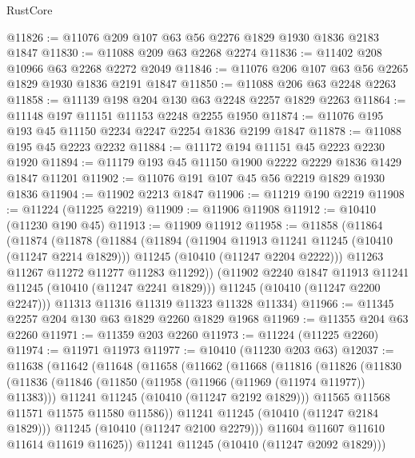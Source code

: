 \begin{lexlean}{RustCore}
\begin{coremodule}
@11826 := @11076 @209 @107 @63 @56 @2276 @1829 @1930 @1836 @2183 @1847
@11830 := @11088 @209 @63 @2268 @2274
@11836 := @11402 @208 @10966 @63 @2268 @2272 @2049
@11846 := @11076 @206 @107 @63 @56 @2265 @1829 @1930 @1836 @2191 @1847
@11850 := @11088 @206 @63 @2248 @2263
@11858 := @11139 @198 @204 @130 @63 @2248 @2257 @1829 @2263
@11864 := @11148 @197 @11151 @11153 @2248 @2255 @1950
@11874 := @11076 @195 @193 @45 @11150 @2234 @2247 @2254 @1836 @2199 @1847
@11878 := @11088 @195 @45 @2223 @2232
@11884 := @11172 @194 @11151 @45 @2223 @2230 @1920
@11894 := @11179 @193 @45 @11150 @1900 @2222 @2229 @1836 @1429 @1847 @11201
@11902 := @11076 @191 @107 @45 @56 @2219 @1829 @1930 @1836
@11904 := @11902 @2213 @1847
@11906 := @11219 @190 @2219
@11908 := @11224 (@11225 @2219)
@11909 := @11906 @11908
@11912 := @10410 (@11230 @190 @45)
@11913 := @11909 @11912
@11958 := @11858
    (@11864
      (@11874
        (@11878
          (@11884
            (@11894
              (@11904 @11913 @11241 @11245 (@10410 (@11247 @2214 @1829)))
              @11245
              (@10410 (@11247 @2204 @2222)))
            @11263
            @11267
            @11272
            @11277
            @11283
            @11292))
        (@11902 @2240 @1847 @11913 @11241 @11245 (@10410 (@11247 @2241 @1829)))
        @11245
        (@10410 (@11247 @2200 @2247)))
      @11313
      @11316
      @11319
      @11323
      @11328
      @11334)
@11966 := @11345 @2257 @204 @130 @63 @1829 @2260 @1829 @1968
@11969 := @11355 @204 @63 @2260
@11971 := @11359 @203 @2260
@11973 := @11224 (@11225 @2260)
@11974 := @11971 @11973
@11977 := @10410 (@11230 @203 @63)
@12037 := @11638
    (@11642
      (@11648
        (@11658
          (@11662
            (@11668
              (@11816
                (@11826
                  (@11830
                    (@11836
                      (@11846
                        (@11850 (@11958 (@11966 (@11969 (@11974 @11977)) @11383)))
                        @11241
                        @11245
                        (@10410 (@11247 @2192 @1829)))
                      @11565
                      @11568
                      @11571
                      @11575
                      @11580
                      @11586))
                  @11241
                  @11245
                  (@10410 (@11247 @2184 @1829)))
                @11245
                (@10410 (@11247 @2100 @2279)))
              @11604
              @11607
              @11610
              @11614
              @11619
              @11625))
          @11241
          @11245
          (@10410 (@11247 @2092 @1829)))

\end{coremodule}
\end{lexlean}

